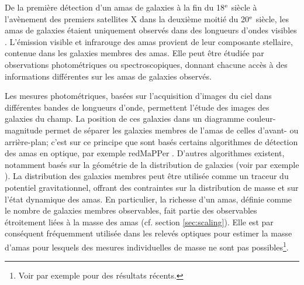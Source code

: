 De la première détection d'un amas de galaxies à la fin du 18$^{\rm e}$ siècle à l'avènement des premiers satellites X dans la deuxième moitié du 20$^{\rm e}$ siècle, les amas de galaxies étaient uniquement observés dans des longueurs d'ondes visibles \cite{biviano_messier_2000}.
L'émission visible et infrarouge des amas provient de leur composante stellaire, contenue dans les galaxies membres des amas.
Elle peut être étudiée par observations photométriques ou spectroscopiques, donnant chacune accès à des informations différentes sur les amas de galaxies observés.

Les mesures photométriques, basées sur l'acquisition d'images du ciel dans différentes bandes de longueurs d'onde, permettent l'étude des images des galaxies du champ.
La position de ces galaxies dans un diagramme couleur-magnitude permet de séparer les galaxies membres de l'amas de celles d'avant- ou arrière-plan; c'est sur ce principe que sont basés certains algorithmes de détection des amas en optique, par exemple redMaPPer \cite{rykoff_redmapper_2014}.
D'autres algorithmes existent, notamment basés sur la géométrie de la distribution de galaxies (voir par exemple \cite{adam_euclid_2019}).
La distribution des galaxies membres peut être utilisée comme un traceur du potentiel gravitationnel, offrant des contraintes sur la distribution de masse et sur l'état dynamique des amas.
En particulier, la richesse d'un amas, définie comme le nombre de galaxies membres observables, fait partie des observables étroitement liées à la masse des amas (cf. section \ref{sec:scaling}).
Elle est par conséquent fréquemment utilisée dans les relevés optiques pour estimer la masse d'amas pour lesquels des mesures individuelles de masse ne sont pas possibles\footnote{Voir par exemple \cite{costanzi_cosmological_2021,phriksee_weak_2020} pour des résultats récents.}.

